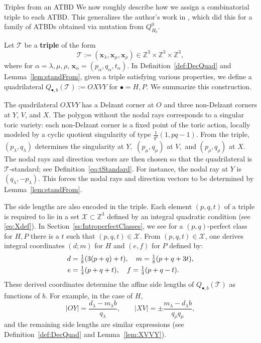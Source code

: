 \documentclass[11pt, reqno]{amsart}
\makeatletter
\def\subsubsection{\@startsection{subsubsection}{3}%
  \z@{.5\linespacing\@plus.7\linespacing}{-.5em}%
  {\normalfont\bfseries}}
\theoremstyle{remark}
\numberwithin{equation}{subsection}
\numberwithin{figure}{section}
\theoremstyle{customremark}
\newcommand{\Tt}{\mathcal{T}}
\newcommand{\al}{{\alpha}}
\newcommand{\la}{{\lambda}}
\newcommand{\X}{\mathcal{X}}
\makeatother
\begin{document}
\subsubsection{Triples from an ATBD}
\label{ss:TriplesATBD} 
We now roughly describe how we assign a combinatorial triple to each ATBD. This generalizes the author's work in \cite{M1}, which did this for a family of ATBDs obtained via  mutation from $Q_{H_b}^0.$

Let $\Tt$ be a \textbf{triple} of the form
\[
\mathcal{T} := (\boldsymbol{x}_\lambda, \boldsymbol{x}_\mu, \boldsymbol{x}_\rho) \in \mathbb{Z}^3 \times \mathbb{Z}^3 \times \mathbb{Z}^3,
\]
where for $\al=\la,\mu,\rho$, $\boldsymbol{x}_\al = (p_\al, q_\al, t_\al)$. In Definition~\ref{def:DecQuad} and Lemma~\ref{lem:standFrom}, given a triple satisfying various properties, we define a quadrilateral $Q_{\bullet,b}(\Tt):=OXVY$ for $\bullet=H,P.$ We summarize this construction. 

The quadrilateral $OXVY$ has a Delzant corner at  $O$ and three non-Delzant corners at $Y$, $V$, and $X$. The polygon without the nodal rays
corresponds to a singular toric variety: each non-Delzant corner is a fixed point
of the toric action, locally modeled by a cyclic quotient singularity of type
$\frac{1}{q^2}(1, pq-1)$. From the triple, $(p_\la,q_\la)$ determines the singularity at $Y,$ $(p_\mu,q_\mu)$ at $V,$ and $(p_\rho,q_\rho)$ at $X.$ 
The nodal rays and direction vectors are then chosen so that the quadrilateral is $\Tt$-standard; see Definition~\ref{eq:tStandard}. For instance, the nodal ray at $Y$ is $(q_\la,-p_\la).$ This forces the nodal rays and direction vectors to be determined by Lemma~\ref{lem:standFrom}. 



The side lengths are also encoded in the triple. Each element $(p,q,t)$ of a triple is required to lie in a set
$\mathcal{X} \subset \mathbb{Z}^3$ defined by an integral quadratic condition
(see \eqref{eq:Xdef}). In Section~\ref{ss:IntroperfectClasses}, we see for a $(p,q)$-perfect class for $H,P$ there is a $t$ such that $(p,q,t) \in \X$. From $(p,q,t) \in \mathcal{X}$, one derives
integral coordinates $(d;m)$ for $H$ and $(e,f)$ for $P$ defined by:
\begin{align}\label{eq:dmefIntro}
d &= \tfrac{1}{8}(3(p+q)+t), \quad m = \tfrac{1}{8}(p+q+3t), \notag\\ e &= \tfrac{1}{4}(p+q+t), \quad f = \tfrac{1}{4}(p+q-t).
\end{align}
These derived coordinates determine the affine side lengths of
$Q_{\bullet,b}(\mathcal{T})$ as functions of $b$. For example, in the case of $H$,
\[
|OY| = \frac{d_\lambda - m_\lambda b}{q_\lambda}, \qquad
|XV| = \pm\frac{m_\lambda - d_\lambda b}{q_\rho q_\mu},
\]
and the remaining side lengths are similar expressions
(see Definition~\ref{def:DecQuad} and Lemma~\ref{lem:XVVY}).
\end{document}

